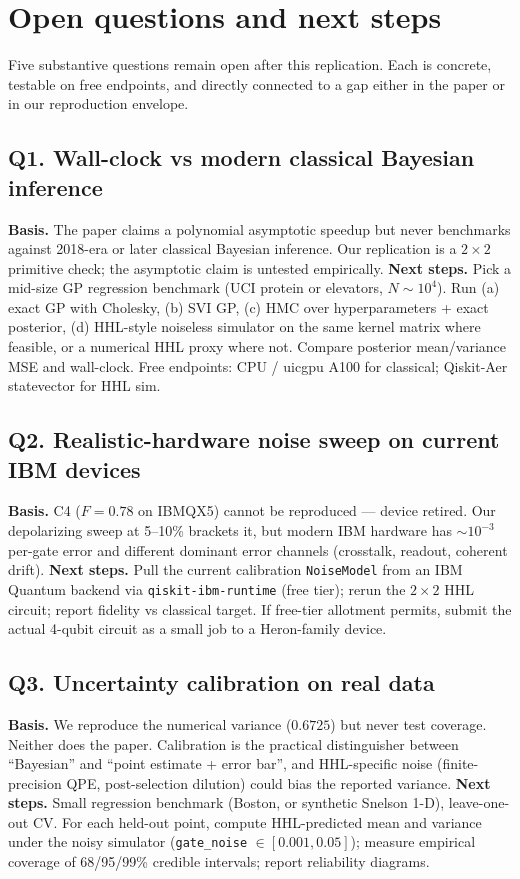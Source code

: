 \section{Open questions and next steps}

Five substantive questions remain open after this replication. Each is
concrete, testable on free endpoints, and directly connected to a gap
either in the paper or in our reproduction envelope.

\subsection*{Q1. Wall-clock vs modern classical Bayesian inference}
\textbf{Basis.} The paper claims a polynomial asymptotic speedup but
never benchmarks against 2018-era or later classical Bayesian
inference. Our replication is a $2\times 2$ primitive check; the
asymptotic claim is untested empirically.
\textbf{Next steps.} Pick a mid-size GP regression benchmark
(UCI protein or elevators, $N \sim 10^4$). Run (a) exact GP with
Cholesky, (b) SVI GP, (c) HMC over hyperparameters + exact posterior,
(d) HHL-style noiseless simulator on the same kernel matrix where
feasible, or a numerical HHL proxy where not. Compare posterior
mean/variance MSE and wall-clock. Free endpoints: CPU / uicgpu A100
for classical; Qiskit-Aer statevector for HHL sim.

\subsection*{Q2. Realistic-hardware noise sweep on current IBM devices}
\textbf{Basis.} C4 ($F=0.78$ on IBMQX5) cannot be reproduced --- device
retired. Our depolarizing sweep at 5--10\% brackets it, but modern IBM
hardware has $\sim 10^{-3}$ per-gate error and different dominant
error channels (crosstalk, readout, coherent drift).
\textbf{Next steps.} Pull the current calibration \texttt{NoiseModel}
from an IBM Quantum backend via \texttt{qiskit-ibm-runtime} (free
tier); rerun the $2\times 2$ HHL circuit; report fidelity vs
classical target. If free-tier allotment permits, submit the actual
4-qubit circuit as a small job to a Heron-family device.

\subsection*{Q3. Uncertainty calibration on real data}
\textbf{Basis.} We reproduce the numerical variance ($0.6725$) but never
test coverage. Neither does the paper. Calibration is the practical
distinguisher between ``Bayesian'' and ``point estimate + error bar'',
and HHL-specific noise (finite-precision QPE, post-selection
dilution) could bias the reported variance.
\textbf{Next steps.} Small regression benchmark (Boston, or synthetic
Snelson 1-D), leave-one-out CV. For each held-out point, compute
HHL-predicted mean and variance under the noisy simulator
(\texttt{gate\_noise} $\in [0.001, 0.05]$); measure empirical
coverage of 68/95/99\% credible intervals; report reliability
diagrams.

